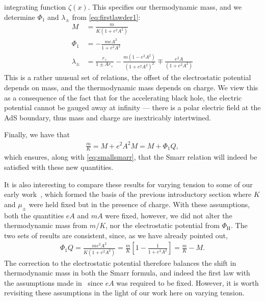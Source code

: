 \documentclass[
twoside,
openright,
frontopenright,
]{dmathesis}
\newcommand{\nn}{\nonumber}
\begin{document}
integrating function $\zeta(x)$. This specifies our thermodynamic mass, and we
determine $\Phi_1$ and $\lambda_\pm$ from \cref{eq:firstlawder1}:
\begin{align}
M &= \frac{m}{K(1+e^2 A^2)} \nn\\
\Phi_1 &= -\frac{meA^2}{1+e^2 A^2}\nn\\
\lambda_\pm &= \frac{r_+}{1\pm Ar_+} - \frac{m(1-e^2A^2)}{(1+e^2 A^2)^2} 
\mp \frac{e^2A}{(1+e^2 A^2)}
\label{TDparams}
\end{align}
This is a rather unusual set of relations, the offset of the electrostatic
potential depends on mass, and the thermodynamic mass depends on charge. We view
this as a consequence of the fact that for the accelerating black hole, the
electric potential cannot be gauged away at infinity --- there is a polar
electric field at the AdS boundary, thus mass and charge are inextricably
intertwined.

Finally, we have that
\begin{align}
  \frac{m}{K} = M+e^2A^2M = M+\Phi_1Q,
\end{align}
which ensures, along with \cref{eq:smallsmarr}, that the Smarr relation will
indeed be satisfied with these new quantities.

It is also interesting to compare these results for varying tension to some of
our early work~\cite{Appels:2016uha}, which formed the basis of the previous
introductory section where $K$ and $\mu_\pm$ were held fixed but in the presence
of charge. With these assumptions, both the quantities $eA$ and $mA$ were fixed,
however, we did not alter the thermodynamic mass from $m/K$, nor the
electrostatic potential from $\Phi_\mathrm{H}$. The two sets of results are
consistent, since, as we have already pointed out,
\begin{align*}
\Phi_1 Q = \frac{m e^2 A^2}{K(1+e^2 A^2)} 
= \frac{m}{K} \left [ 1 - \frac{1}{1+e^2 A^2} \right] = \frac{m}{K} - M.
\end{align*}
The correction to the electrostatic potential therefore balances the shift in
thermodynamic mass in both the Smarr formula, and indeed the first law with the
assumptions made in~\cite{Appels:2016uha} since $eA$ was required to be
fixed. However, it is worth revisiting these assumptions in the light of our
work here on varying tension.
\end{document}
